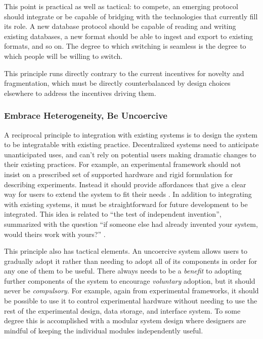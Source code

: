 \documentclass[10pt]{article}
\begin{document}
\begin{multicols}{2}
This point is practical as well as tactical: to compete, an emerging
protocol should integrate or be capable of bridging with the
technologies that currently fill its role. A new database protocol
should be capable of reading and writing existing databases, a new
format should be able to ingest and export to existing formats, and so
on. The degree to which switching is seamless is the degree to which
people will be willing to switch.

This principle runs directly contrary to the current incentives for
novelty and fragmentation, which must be directly counterbalanced by
design choices elsewhere to address the incentives driving them.

\hypertarget{embrace-heterogeneity-be-uncoercive}{%
\subsubsection{Embrace Heterogeneity, Be
Uncoercive}\label{embrace-heterogeneity-be-uncoercive}}

A reciprocal principle to integration with existing systems is to design
the system to be integratable with existing practice. Decentralized
systems need to anticipate unanticipated uses, and can't rely on
potential users making dramatic changes to their existing practices. For
example, an experimental framework should not insist on a prescribed set
of supported hardware and rigid formulation for describing experiments.
Instead it should provide affordances that give a clear way for users to
extend the system to fit their needs \cite{carpenterRFC1958Architectural1996} . In addition to integrating with
existing systems, it must be straightforward for future development to
be integrated. This idea is related to ``the test of independent
invention'', summarized with the question ``if someone else had already
invented your system, would theirs work with yours?'' \cite{berners-leePrinciplesDesign1998} .

This principle also has tactical elements. An uncoercive system allows
users to gradually adopt it rather than needing to adopt all of its
components in order for any one of them to be useful. There always needs
to be a \emph{benefit} to adopting further components of the system to
encourage \emph{voluntary} adoption, but it should never be
\emph{compulsory.} For example, again from experimental frameworks, it
should be possible to use it to control experimental hardware without
needing to use the rest of the experimental design, data storage, and
interface system. To some degree this is accomplished with a modular
system design where designers are mindful of keeping the individual
modules independently useful.


\end{multicols}
\end{document}
